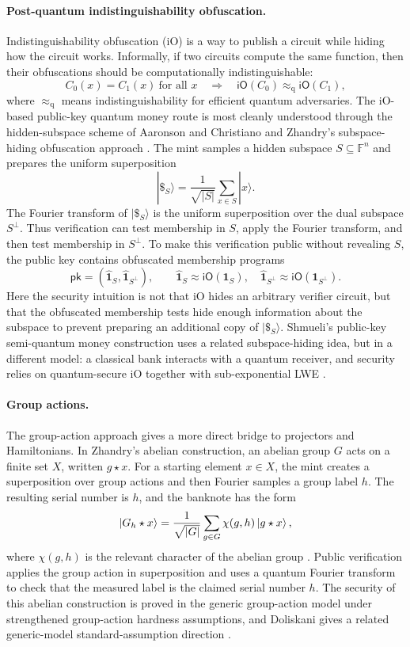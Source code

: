 \documentclass[12pt]{article}
\begin{document}
\paragraph{Post-quantum indistinguishability obfuscation.}
Indistinguishability obfuscation (iO) is a way to publish a circuit while hiding how the circuit works.
Informally, if two circuits compute the same function, then their obfuscations should be computationally indistinguishable:
\[
C_0(x)=C_1(x)\ \text{for all }x
\quad \Longrightarrow \quad
\mathsf{iO}(C_0)\approx_{\mathrm{q}}\mathsf{iO}(C_1),
\]
where $\approx_{\mathrm{q}}$ means indistinguishability for efficient quantum adversaries.
The iO-based public-key quantum money route is most cleanly understood through the hidden-subspace scheme of Aaronson and Christiano and Zhandry's subspace-hiding obfuscation approach \cite{aaronsonChristianoQuantumMoneyHidden2012,zhandryQuantumLightningNever2017a}.
The mint samples a hidden subspace $S\subseteq \mathbb{F}^n$ and prepares the uniform superposition
\[
|\$_S\rangle=\frac{1}{\sqrt{|S|}}\sum_{x\in S}|x\rangle.
\]
The Fourier transform of $|\$_S\rangle$ is the uniform superposition over the dual subspace $S^\perp$.
Thus verification can test membership in $S$, apply the Fourier transform, and then test membership in $S^\perp$.
To make this verification public without revealing $S$, the public key contains obfuscated membership programs
\[
\mathsf{pk}=(\widehat{\mathbf{1}}_S,\widehat{\mathbf{1}}_{S^\perp}),
\qquad
\widehat{\mathbf{1}}_S\approx \mathsf{iO}(\mathbf{1}_S),\quad
\widehat{\mathbf{1}}_{S^\perp}\approx \mathsf{iO}(\mathbf{1}_{S^\perp}).
\]
Here the security intuition is not that iO hides an arbitrary verifier circuit, but that the obfuscated membership tests hide enough information about the subspace to prevent preparing an additional copy of $|\$_S\rangle$.
Shmueli's public-key semi-quantum money construction uses a related subspace-hiding idea, but in a different model: a classical bank interacts with a quantum receiver, and security relies on quantum-secure iO together with sub-exponential LWE \cite{shmueliPublicKeyQuantum2022}.

\paragraph{Group actions.}
The group-action approach gives a more direct bridge to projectors and Hamiltonians.
In Zhandry's abelian construction, an abelian group $G$ acts on a finite set $X$, written $g\star x$.
For a starting element $x\in X$, the mint creates a superposition over group actions and then Fourier samples a group label $h$.
The resulting serial number is $h$, and the banknote has the form
\[
|G_h\star x\rangle
=\frac{1}{\sqrt{|G|}}\sum_{g\in G}\chi(g,h)\ket{g\star x},
\]
where $\chi(g,h)$ is the relevant character of the abelian group \cite{zhandryQuantumMoneyAbelian2025}.
Public verification applies the group action in superposition and uses a quantum Fourier transform to check that the measured label is the claimed serial number $h$.
The security of this abelian construction is proved in the generic group-action model under strengthened group-action hardness assumptions, and Doliskani gives a related generic-model standard-assumption direction \cite{doliskaniPublicKeyQuantum2025}.
\end{document}
